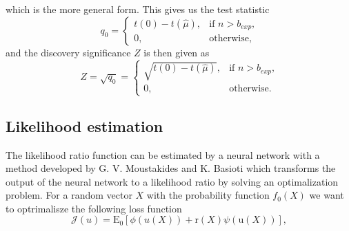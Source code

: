 \documentclass[../../main/main.tex]{subfiles}
\begin{document}
which is the more general form. This gives us the test statistic
\begin{equation}
  \label{eq:5}
  q_0=\begin{cases}
        t(0) - t(\hat{\mu}), & \text{if \(n > b_{exp}\),}\\
        0, & \text{otherwise},
      \end{cases}
\end{equation}
and the discovery significance \(Z\) is then given as
\begin{equation}
  \label{eq:discovery-sig-likelihood}
  Z = \sqrt{q_0} = \begin{cases}
        \sqrt{t(0) - t(\hat{\mu})}, & \text{if \(n > b_{exp}\),}\\
        0, & \text{otherwise}.
      \end{cases}
\end{equation}

\subsection{Likelihood estimation}
\label{sec:likel-estim}

The likelihood ratio function can be estimated by a neural network with a method developed by G. V. Moustakides and K. Basioti \cite{moustakides2019training} which transforms the output of the neural network to a likelihood ratio by solving an optimalization problem. For a random vector \(X\) with the probability function \(f_0(X)\) we want to optrimalisze the following loss function
\begin{equation}
  \label{eq:likilhood-loss}
  \mathcal{J}(u) = \mathrm{E_0}[\phi(u(X)) + \mathrm{r}(X)\psi(\mathrm{u}(X))],
\end{equation}
\end{document}
